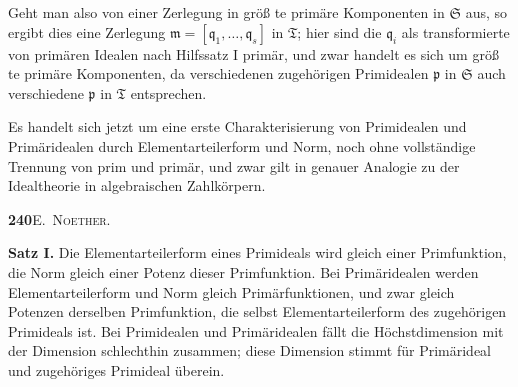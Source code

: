 \documentclass[12pt,a4paper]{article}
\begin{document}
{{Geht man also von einer Zerlegung in gr\"{o}{\ss} te prim\"{a}re Komponenten
in $\mathfrak{S}$ aus, so ergibt dies eine Zerlegung $\mathfrak{m}=[\mathfrak{q}_{1},\dots,\mathfrak{q}_{s}]$ in $\mathfrak{T}$; hier sind die $\mathfrak{q}_{i}$
als transformierte von prim\"{a}ren Idealen nach Hilfssatz I prim\"{a}r, und
zwar handelt es sich um gr\"{o}{\ss} te prim\"{a}re Komponenten, da verschiedenen
zugeh\"{o}rigen Primidealen $\mathfrak{p}$ in $\mathfrak{S}$ auch verschiedene $\mathfrak{p}$ in $\mathfrak{T}$ entsprechen.

Es handelt sich jetzt um eine erste Charakterisierung von Primidealen
und Prim\"{a}ridealen durch Elementarteilerform und Norm, noch ohne vollst\"{a}ndige
Trennung von prim und prim\"{a}r, und zwar gilt in genauer Analogie
zu der Idealtheorie in algebraischen Zahlk\"{o}rpern.

\newpage
\begin{center}
\textbf{240}\quad\textsc{E.~Noether.}
\end{center}

\textbf{Satz I.} Die Elementarteilerform eines Primideals wird gleich einer
Primfunktion, die Norm gleich einer Potenz dieser Primfunktion. Bei
Prim\"{a}ridealen werden Elementarteilerform und Norm gleich Prim\"{a}rfunktionen,
und zwar gleich Potenzen derselben Primfunktion, die selbst Elementarteilerform
des zugeh\"{o}rigen Primideals ist. Bei Primidealen und
Prim\"{a}ridealen f\"{a}llt die H\"{o}chstdimension mit der Dimension schlechthin
zusammen; diese Dimension stimmt f\"{u}r Prim\"{a}rideal und zugeh\"{o}riges
Primideal \"{u}berein.

}}
\end{document}
